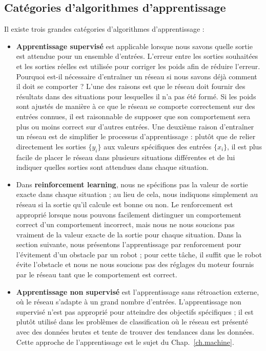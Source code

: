 \subsection{Catégories d'algorithmes d'apprentissage}

Il existe trois grandes catégories d'algorithmes d'apprentissage :

\begin{itemize}
\item \textbf{Apprentissage supervisé} est applicable lorsque nous savons quelle sortie est attendue pour un ensemble d'entrées. L'erreur entre les sorties souhaitées et les sorties réelles est utilisée pour corriger les poids afin de réduire l'erreur. Pourquoi est-il nécessaire d'entraîner un réseau si nous savons déjà comment il doit se comporter ? L'une des raisons est que le réseau doit fournir des résultats dans des situations pour lesquelles il n'a pas été formé. Si les poids sont ajustés de manière à ce que le réseau se comporte correctement sur des entrées connues, il est raisonnable de supposer que son comportement sera plus ou moins correct sur d'autres entrées. Une deuxième raison d'entraîner un réseau est de simplifier le processus d'apprentissage : plutôt que de relier directement les sorties $\{y_i\}$ aux valeurs spécifiques des entrées $\{x_i\}$, il est plus facile de placer le réseau dans plusieurs situations différentes et de lui indiquer quelles sorties sont attendues dans chaque situation.

\item Dans \textbf{reinforcement learning}, nous ne spécifions pas la valeur de sortie exacte dans chaque situation ; au lieu de cela, nous indiquons simplement au réseau si la sortie qu'il calcule est bonne ou non. Le renforcement est approprié lorsque nous pouvons facilement distinguer un comportement correct d'un comportement incorrect, mais nous ne nous soucions pas vraiment de la valeur exacte de la sortie pour chaque situation. Dans la section suivante, nous présentons l'apprentissage par renforcement pour l'évitement d'un obstacle par un robot ; pour cette tâche, il suffit que le robot évite l'obstacle et nous ne nous soucions pas des réglages du moteur fournis par le réseau tant que le comportement est correct.

\item \textbf{Apprentissage non supervisé} est l'apprentissage sans rétroaction externe, où le réseau s'adapte à un grand nombre d'entrées. L'apprentissage non supervisé n'est pas approprié pour atteindre des objectifs spécifiques ; il est plutôt utilisé dans les problèmes de classification où le réseau est présenté avec des données brutes et tente de trouver des tendances dans les données. Cette approche de l'apprentissage est le sujet du Chap.~\ref{ch.machine}.
\end{itemize}

